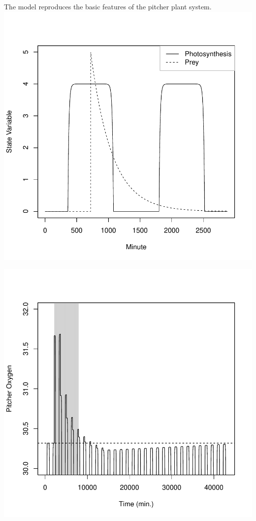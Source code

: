 \documentclass[a0,landscape]{a0poster}
\begin{document}
\begin{multicols}{4}
\begin{block}{The model reproduces the basic features of the pitcher plant system.}
\includegraphics{conference_poster_5-base}

\end{block}


\begin{block}{}
\includegraphics{conference_poster_5-hyst}


\end{block}
\end{multicols}
\end{document}
